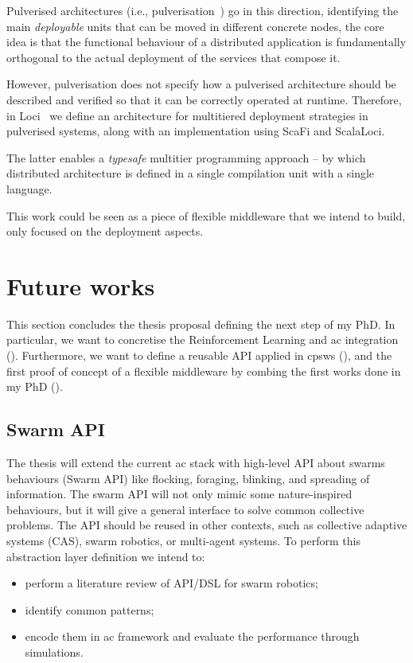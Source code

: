 \documentclass[11pt]{article}
\begin{document}
Pulverised architectures (i.e., pulverisation~\cite{DBLP:journals/fi/CasadeiPPVW20}) go in this direction, identifying the main \textit{deployable} units that can be moved in different concrete nodes, the core idea is that the functional behaviour of a distributed application is fundamentally orthogonal to the actual deployment of the services that compose it.

However, pulverisation does not specify how a pulverised architecture should
be described and verified so that it can be correctly operated at runtime.
Therefore, in \scafi{} Loci~\cite{DBLP:conf/acsos/AguzziCPSV21} we define an architecture for multitiered deployment strategies in pulverised systems, along with an implementation using ScaFi and ScalaLoci.

The latter enables a \textit{typesafe} multitier programming approach -- by which distributed architecture is defined
in a single compilation unit with a single language.

This work could be seen as a piece of flexible middleware that we intend to build, only focused on the deployment aspects.

\section{Future works}\label{future}
This section concludes the thesis proposal defining the next step of my PhD. In particular, we want to concretise the Reinforcement Learning and \ac{ac} integration (). Furthermore, we want to define a reusable API applied in \acp{cpsw} (), and the first proof of concept of a flexible middleware by combing the first works done in my PhD (). 
\subsection{Swarm API}\label{swarm-api}
The thesis will extend the current \ac{ac} stack with high-level API about swarms behaviours (Swarm API) like flocking, foraging, blinking, and spreading of information. The swarm API will not only mimic some nature-inspired behaviours, but it will give a general interface to solve common collective problems. The API should be reused in other contexts, such as collective adaptive systems (CAS), swarm robotics, or multi-agent systems.
To perform this abstraction layer definition we intend to:
\begin{itemize}
	\item perform a literature review of API/DSL for swarm robotics;
	\item identify common patterns;
	\item encode them in \ac{ac} framework and evaluate the performance through simulations.
\end{itemize}
\end{document}

